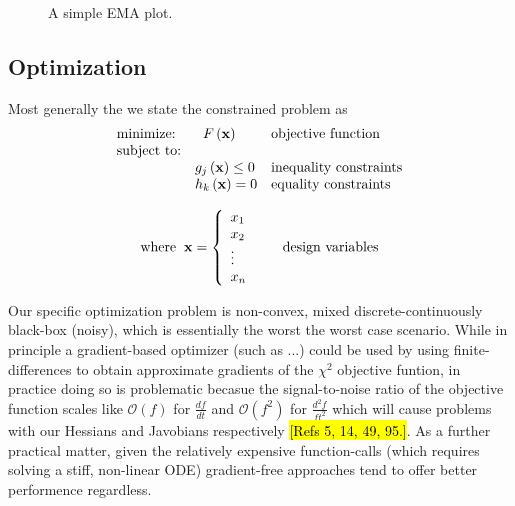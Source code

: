 \documentclass[10pt,a4paper]{article}
\begin{document}
\begin{figure}[htb]
    \centering
    \resizebox{14cm}{!}{}
    \caption{A simple EMA plot.\label{fig:convergence}}
\end{figure}

\subsection{Optimization}
Most generally the we state the constrained problem as 
\[
\begin{array}{lll}
\mbox{minimize:} & \hspace{2 mm} F\left(\mathbf{x}\right) & \mbox{objective function}\\
\mbox{subject to:} & & \\
& \centering g_j \left( \mathbf{x} \right) \leq 0 & \mbox{inequality constraints}\\
& \centering h_k \left(\mathbf{x} \right) = 0 & \mbox{equality constraints}
\end{array}
 \]

\[ 
\begin{array}{ll}
\mbox{where} \hspace{2 mm} \mathbf{x} = \left\{ \begin{array}{ll}

x_1 & \\
x_2 & \\
\vdots &\\
x_n &
\end{array} \right. & \mbox{design variables}
\end{array}
\]

Our specific optimization problem is non-convex, mixed discrete-continuously black-box (noisy), which is essentially the worst the worst case scenario. While in principle a gradient-based optimizer (such as ...) could be used by using finite-differences to obtain approximate gradients of the $\chi^2$ objective funtion, in practice doing so is problematic becasue the signal-to-noise ratio of the objective function scales like $\mathcal{O}(f)$ for $\frac{df}{dt}$ and $\mathcal{O}(f^2)$ for $\frac{d^2f}{ft^2}$ which will cause problems with our Hessians and Javobians respectively \hl{[Refs 5, 14, 49, 95.]}. As a further practical matter, given the relatively expensive function-calls (which requires solving a stiff, non-linear ODE) gradient-free approaches tend to offer better performence regardless. 
\end{document}
